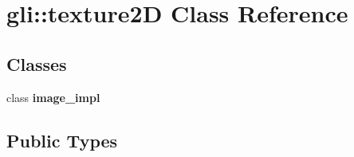 \hypertarget{classgli_1_1texture2D}{\section{gli\-:\-:texture2\-D \-Class \-Reference}
\label{classgli_1_1texture2D}
}
\subsection*{\-Classes}
\begin{DoxyCompactItemize}
\item 
class {\bfseries image\-\_\-impl}
\end{DoxyCompactItemize}
\subsection*{\-Public \-Types}
